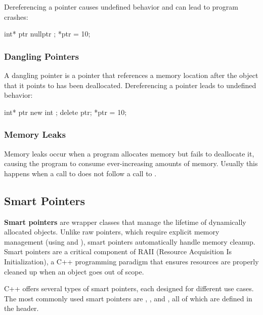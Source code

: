 \documentclass[12pt]{article}
\begin{document}
\noindent
Dereferencing a  pointer causes undefined behavior and can lead to program crashes:

\begin{cxx}{}
int* ptr { nullptr };
*ptr = 10;
\end{cxx}

\subsubsection{Dangling Pointers}

\noindent
A dangling pointer is a pointer that references a memory location after the object that it points to has been deallocated.
Dereferencing a pointer leads to undefined behavior:

\begin{cxx}{}
int* ptr { new int };
delete ptr;
*ptr = 10;
\end{cxx}

\subsubsection{Memory Leaks}

\noindent
Memory leaks occur when a program allocates memory but fails to deallocate it, causing the program to consume ever-increasing amounts of memory.
Usually this happens when a call to  does not follow a call to .

\subsection{Smart Pointers}

\noindent
\textbf{Smart pointers} are wrapper classes that manage the lifetime of dynamically allocated objects.
Unlike raw pointers, which require explicit memory management (using  and ), smart pointers automatically handle memory cleanup.
Smart pointers are a critical component of RAII (Resource Acquisition Is Initialization), a C++ programming paradigm that ensures resources are properly cleaned up when an object goes out of scope.

\vspace{1em}
\noindent
C++ offers several types of smart pointers, each designed for different use cases.
The most commonly used smart pointers are , , and , all of which are defined in the  header.
\end{document}
